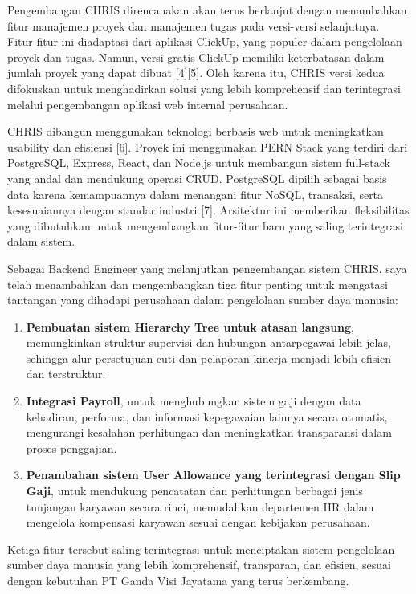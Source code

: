 Pengembangan CHRIS direncanakan akan terus berlanjut dengan menambahkan 
fitur manajemen proyek dan manajemen tugas pada versi-versi selanjutnya. 
Fitur-fitur ini diadaptasi dari aplikasi ClickUp, yang populer dalam pengelolaan 
proyek dan tugas. Namun, versi gratis ClickUp memiliki keterbatasan dalam jumlah 
proyek yang dapat dibuat [4][5]. Oleh karena itu, CHRIS versi kedua difokuskan 
untuk menghadirkan solusi yang lebih komprehensif dan terintegrasi melalui 
pengembangan aplikasi web internal perusahaan.

CHRIS dibangun menggunakan teknologi berbasis web untuk meningkatkan usability 
dan efisiensi [6]. Proyek ini menggunakan PERN Stack yang terdiri dari PostgreSQL, 
Express, React, dan Node.js untuk membangun sistem full-stack yang andal dan 
mendukung operasi CRUD. PostgreSQL dipilih sebagai basis data karena kemampuannya 
dalam menangani fitur NoSQL, transaksi, serta kesesuaiannya dengan standar 
industri [7]. Arsitektur ini memberikan fleksibilitas yang dibutuhkan untuk 
mengembangkan fitur-fitur baru yang saling terintegrasi dalam sistem.

Sebagai Backend Engineer yang melanjutkan pengembangan sistem CHRIS, saya telah 
menambahkan dan mengembangkan tiga fitur penting untuk mengatasi tantangan 
yang dihadapi perusahaan dalam pengelolaan sumber daya manusia:

\begin{enumerate}
    \item \textbf{Pembuatan sistem Hierarchy Tree untuk atasan langsung}, 
    memungkinkan struktur supervisi dan hubungan antarpegawai lebih jelas, 
    sehingga alur persetujuan cuti dan pelaporan kinerja menjadi lebih efisien 
    dan terstruktur.
    
    \item \textbf{Integrasi Payroll}, untuk menghubungkan sistem gaji dengan 
    data kehadiran, performa, dan informasi kepegawaian lainnya secara otomatis, 
    mengurangi kesalahan perhitungan dan meningkatkan transparansi dalam proses 
    penggajian.
    
    \item \textbf{Penambahan sistem User Allowance yang terintegrasi dengan 
    Slip Gaji}, untuk mendukung pencatatan dan perhitungan berbagai jenis tunjangan 
    karyawan secara rinci, memudahkan departemen HR dalam mengelola kompensasi 
    karyawan sesuai dengan kebijakan perusahaan.
\end{enumerate}

Ketiga fitur tersebut saling terintegrasi untuk menciptakan sistem pengelolaan 
sumber daya manusia yang lebih komprehensif, transparan, dan efisien, sesuai 
dengan kebutuhan PT Ganda Visi Jayatama yang terus berkembang.

